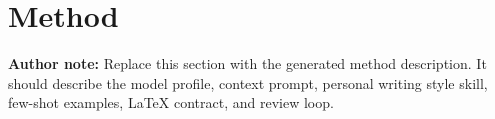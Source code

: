 \section{Method}

\textbf{Author note:} Replace this section with the generated method description. It should describe the model profile, context prompt, personal writing style skill, few-shot examples, LaTeX contract, and review loop.
